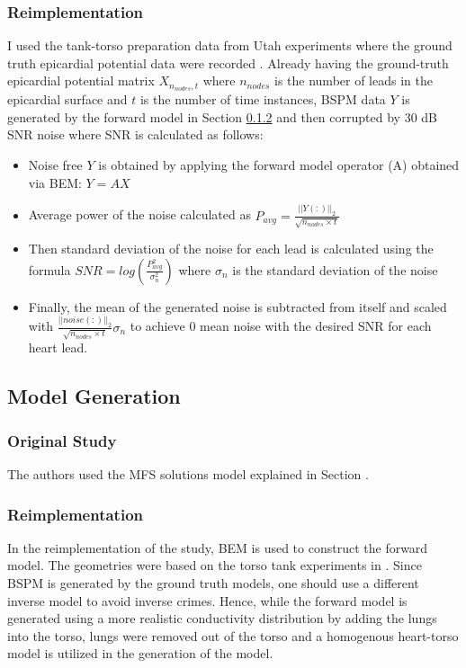 \documentclass[draftcls, onecolumn, journal]{IEEEtran}
\begin{document}
\subsubsection{Reimplementation}

I used the tank-torso preparation data from Utah experiments where the ground truth epicardial potential data were recorded \cite*{macleod1995electrocardiographic}. Already having the ground-truth epicardial potential matrix $X_{n_{nodes},t}$ where $n_{nodes}$ is the number of leads in the epicardial surface and $t$ is the number of time instances, BSPM data $Y$ is generated by the forward model in Section \ref{subsec:modelreimplement} and then corrupted by 30 dB SNR noise where SNR is calculated as follows:
\begin{itemize}
    \item Noise free $Y$ is obtained by applying the forward model operator (A) obtained via BEM: $Y = AX$
    \item Average power of the noise calculated as $P_{avg} = \frac{||Y(:)||_2}{\sqrt{n_{nodes} \times t}}$
    \item Then standard deviation of the noise for each lead is calculated using the formula $SNR = log(\frac{P_{avg}^2}{\sigma_n^2})$ where $\sigma_n$ is the standard deviation of the noise
    \item Finally, the mean of the generated noise is subtracted from itself and scaled with $\frac{||noise(:)||_2}{\sqrt{n_{nodes} \times t}}\sigma_n$ to achieve 0 mean noise with the desired SNR for each heart lead. 
\end{itemize}

\subsection{Model Generation} \label{subsec:modelgeneration}

\subsubsection{Original Study}

The authors used the MFS solutions model explained in Section .

\subsubsection{Reimplementation}\label{subsec:modelreimplement}

In the reimplementation of the study, BEM is used to construct the forward model. The geometries were based on the torso tank experiments in \cite{macleod1995electrocardiographic}. Since BSPM is generated by the ground truth models, one should use a different inverse model to avoid inverse crimes. Hence, while the forward model is generated using a more realistic conductivity distribution by adding the lungs into the torso, lungs were removed out of the torso and a homogenous heart-torso model is utilized in the generation of the model. 
\end{document}
